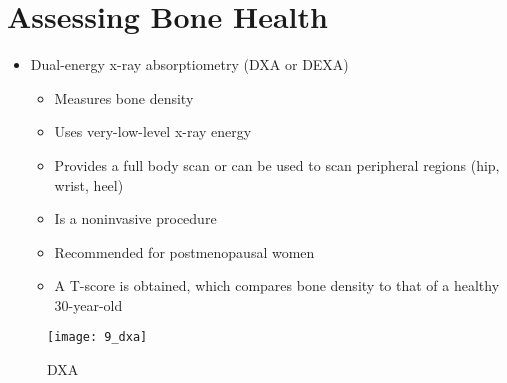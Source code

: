 \documentclass[title={Chapter 9}]{fdsn201notes}
\begin{document}
\section{Assessing Bone Health}\label{sec:assessing-bone-health}
\begin{itemize}
	\item Dual-energy x-ray absorptiometry (DXA or DEXA)
	\begin{itemize}
		\item Measures bone density
		\item Uses very-low-level x-ray energy
		\item Provides a full body scan or can be used to scan peripheral regions (hip, wrist, heel)
		\item Is a noninvasive procedure
		\item Recommended for postmenopausal women
		\item A T-score is obtained, which compares bone density to that of a healthy 30-year-old
	\end{itemize}
\end{itemize}

\begin{figure}[H]
	\centering
	\texttt{[image: 9\_dxa]}
	\caption{DXA}
	\label{fig:dxa}
\end{figure}
\end{document}
